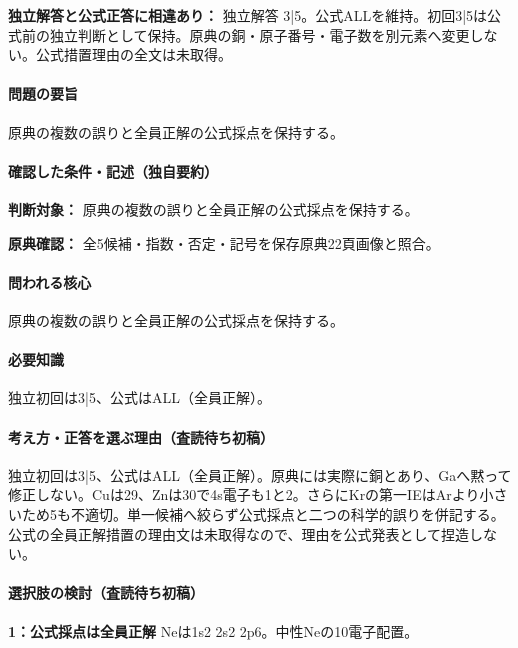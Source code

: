 \par\textbf{独立解答と公式正答に相違あり：} 独立解答 3|5。公式ALLを維持。初回3|5は公式前の独立判断として保持。原典の銅・原子番号・電子数を別元素へ変更しない。公式措置理由の全文は未取得。

\paragraph{問題の要旨} 原典の複数の誤りと全員正解の公式採点を保持する。

\paragraph{確認した条件・記述（独自要約）}\mbox{}\par

\noindent\textbf{判断対象：} 原典の複数の誤りと全員正解の公式採点を保持する。\par

\noindent\textbf{原典確認：} 全5候補・指数・否定・記号を保存原典22頁画像と照合。\par

\paragraph{問われる核心} 原典の複数の誤りと全員正解の公式採点を保持する。

\paragraph{必要知識} 独立初回は3|5、公式はALL（全員正解）。

\paragraph{考え方・正答を選ぶ理由（査読待ち初稿）} 独立初回は3|5、公式はALL（全員正解）。原典には実際に銅とあり、Gaへ黙って修正しない。Cuは29、Znは30で4s電子も1と2。さらにKrの第一IEはArより小さいため5も不適切。単一候補へ絞らず公式採点と二つの科学的誤りを併記する。公式の全員正解措置の理由文は未取得なので、理由を公式発表として捏造しない。

\paragraph{選択肢の検討（査読待ち初稿）}\mbox{}\par

\noindent\textbf{1：公式採点は全員正解} Neは1s2 2s2 2p6。中性Neの10電子配置。\par

